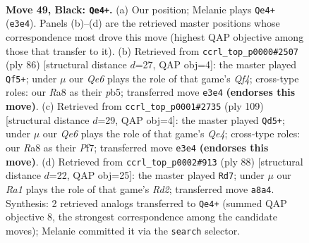 \documentclass[11pt]{article}
\begin{document}
\clearpage

\begin{figure}[p]\centering
\begin{subfigure}{0.46\textwidth}\centering
\resizebox{\linewidth}{!}{%
\newchessgame
\chessboard[
  setfen={r7/1Q6/4kp2/3p4/5P2/p3q1P1/P5KP/8 b - - 18 49},
  showmover=false,
  pgfstyle=straightmove, color=movearrow, markmove={e3-e4}
]}
\caption{}
\end{subfigure}\hfill
\begin{subfigure}{0.46\textwidth}\centering
\resizebox{\linewidth}{!}{%
\newchessgame
\chessboard[
  setfen={8/5ppk/p6p/1p6/1P3Q2/q6P/5PPK/8 w - - 0 44},
  showmover=false,
  pgfstyle=straightmove, color=movearrow, markmove={f4-f5}
]}
\caption{}
\end{subfigure}
\\[4pt]
\begin{subfigure}{0.46\textwidth}\centering
\resizebox{\linewidth}{!}{%
\newchessgame
\chessboard[
  setfen={8/4kp2/4p2Q/4q1p1/6P1/4P2P/5PK1/8 b - - 10 55},
  showmover=false,
  pgfstyle=straightmove, color=movearrow, markmove={e5-d5}
]}
\caption{}
\end{subfigure}\hfill
\begin{subfigure}{0.46\textwidth}\centering
\resizebox{\linewidth}{!}{%
\newchessgame
\chessboard[
  setfen={8/5pbk/4p1p1/7p/P7/2P2Q1P/3R2K1/2q5 w - - 0 45},
  showmover=false,
  pgfstyle=straightmove, color=movearrow, markmove={d2-d7}
]}
\caption{}
\end{subfigure}
\caption{\textbf{Move 49, Black: \texttt{Qe4+}.} (a) Our position; Melanie plays \texttt{Qe4+} (\texttt{e3e4}). Panels (b)--(d) are the retrieved master positions whose correspondence most drove this move (highest QAP objective among those that transfer to it). (b) Retrieved from \texttt{ccrl\_top\_p0000\#2507} (ply 86) [structural distance $d$=27, QAP obj=4]: the master played \texttt{Qf5+}; under $\mu$ our \emph{Qe6} plays the role of that game's \emph{Qf4}; cross-type roles: our \emph{R}a8 as their \emph{p}b5; transferred move \texttt{e3e4} \textbf{(endorses this move)}. (c) Retrieved from \texttt{ccrl\_top\_p0001\#2735} (ply 109) [structural distance $d$=29, QAP obj=4]: the master played \texttt{Qd5+}; under $\mu$ our \emph{Qe6} plays the role of that game's \emph{Qe4}; cross-type roles: our \emph{R}a8 as their \emph{P}f7; transferred move \texttt{e3e4} \textbf{(endorses this move)}. (d) Retrieved from \texttt{ccrl\_top\_p0002\#913} (ply 88) [structural distance $d$=22, QAP obj=25]: the master played \texttt{Rd7}; under $\mu$ our \emph{Ra1} plays the role of that game's \emph{Rd2}; transferred move \texttt{a8a4}. Synthesis: 2 retrieved analogs transferred to \texttt{Qe4+} (summed QAP objective 8, the strongest correspondence among the candidate moves); Melanie committed it via the \texttt{search} selector.}
\label{fig:thought-m97}
\end{figure}
\end{document}
